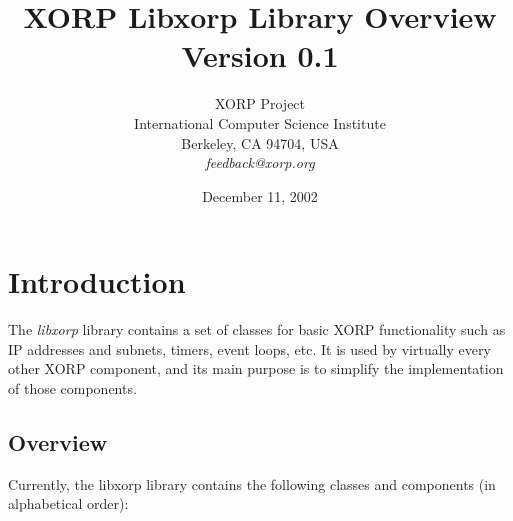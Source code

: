 \documentclass[11pt]{article}
\begin{document}
\title{XORP Libxorp Library Overview \\
\vspace{1ex}
Version 0.1}
\author{ XORP Project					\\
	 International Computer Science Institute	\\
	 Berkeley, CA 94704, USA			\\
	 {\it feedback@xorp.org}
}
\date{December 11, 2002}

\maketitle

\thispagestyle{empty}


\section{Introduction}

The \emph{libxorp} library contains a set of classes for basic
XORP functionality such as IP addresses and subnets, timers, event
loops, etc. It is used by virtually every other XORP component, and
its main purpose is to simplify the implementation of those components.

\subsection{Overview}

Currently, the libxorp library contains the following classes and
components (in alphabetical order):
\end{document}
